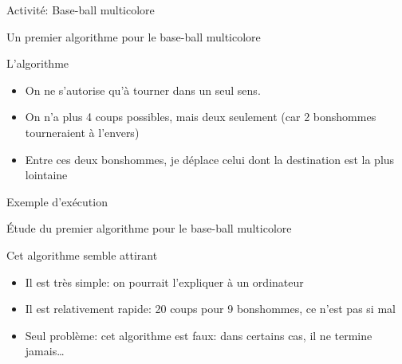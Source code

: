 \documentclass[final,hyperref={pdfpagelabels=false}]{beamer}
\renewenvironment{Coupe}{   }{   }
\renewcommand*{\small}{\fontsize{\resultsmallX}{\resultsmallY}\selectfont}
\begin{document}
\begin{Coupe}
\begin{frame}{Activité: Base-ball multicolore}
\end{frame}
\newcommand{\flecherond}[1]{
  \draw[ultra thick] (0,0) circle (3mm);
  \draw[ultra thick,rotate=#1*72] (3mm,0) -- +(-.15,-.08);
  \draw[ultra thick,rotate=#1*72] (3mm,0) -- +(.08,-.15);
  \draw[fill=white,draw=white,rotate=#1*72] (3mm,2.5pt) circle (2pt);
}
\begin{frame}{Un premier algorithme pour le base-ball multicolore}
  \begin{block}{L'algorithme}
    \begin{itemize}
    \item On ne s'autorise qu'à tourner dans un seul sens.
    \item On n'a plus 4 coups possibles, mais deux seulement (car 2 bonshommes
      tourneraient à l'envers)
    \item Entre ces deux bonshommes, je déplace celui dont la destination est la
      plus lointaine
    \end{itemize}
  \end{block}


  \begin{block}{Exemple d'exécution}
    
  \end{block}
\end{frame}
\newcommand{\maisonOk}[1]{\foreach \x in {#1} {\draw[shift=(m.corner \x)] node
    {\small x};}}
\begin{frame}{Étude du premier algorithme pour le base-ball multicolore}
  \begin{block}{Cet algorithme semble attirant}
    \begin{itemize}
    \item Il est très simple: on pourrait l'expliquer à un ordinateur
    \item Il est relativement rapide: 20 coups pour 9 bonshommes, ce n'est pas
      si mal
    \item Seul problème: cet algorithme est faux: dans certains cas, il ne
      termine jamais\ldots
    \end{itemize}
  \end{block}


\end{frame}
\end{Coupe}
\end{document}
